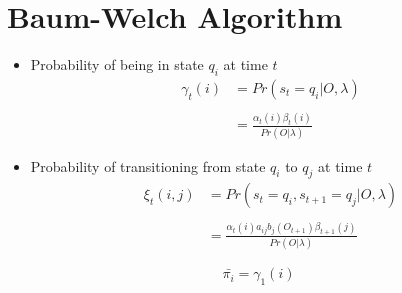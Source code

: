 \section{Baum-Welch Algorithm}
\begin{frame}
\begin{itemize}
\item Probability of being in state $q_i$ at time $t$
\begin{align*}
  	\gamma_t(i) &= Pr(s_t = q_i \vert O, \lambda) \\ \\
		    &= \frac{\alpha_t(i)\beta_t(i)}{Pr(O \vert \lambda)} 
\end{align*}  

\item Probability of transitioning from state $q_i$ to $q_j$ at time $t$
\begin{align*}
	\xi_t(i,j) &= Pr(s_t = q_i, s_{t+1} = q_j \vert O, \lambda) \\ \\
                        &= \frac{\alpha_t(i)a_{ij}b_j(O_{t+1})\beta_{t+1}(j)}{Pr(O \vert \lambda)} 
\end{align*}
\end{itemize}
\end{frame}








\begin{frame}
$$ \bar{\pi_i} = \gamma_1(i)$$



\end{frame}














